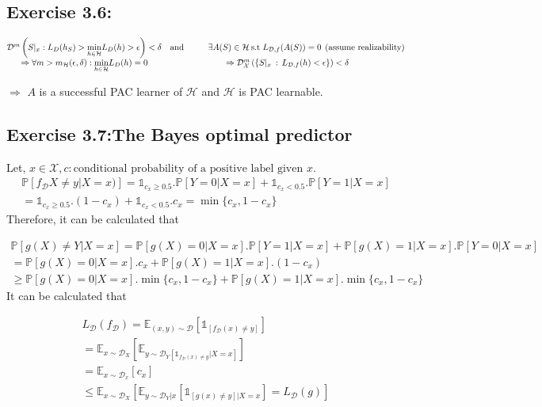\documentclass[]{book}
\begin{document}
\subsection*{Exercise 3.6:}
\begin{equation*}
\begin{matrix}
\mathcal{D}^m\left ( S|_x:L_{D}(h_S)>\underset{h\in \mathcal{H}}{\min}L_{D}(h)>\epsilon \right )<\delta &  \text{and} \hspace{1cm} \exists A(S)\in \mathcal{H} \: \text{s.t} \hspace{0.1cm} L_{\mathcal{D},f}(A(S))=0 \: \: \text{(assume realizability)}    \\ 
\Rightarrow \forall m>m_\mathcal{H}(\epsilon,\delta):\underset{h\in \mathcal{H}}{\min}L_{D}(h)=0 & \Rightarrow  \mathcal{D}^m_\mathcal{X}\left ( \left \{ S|_x \::\,L_{\mathcal{D},f}(h)<\epsilon \right \} \right )<\delta \\
\end{matrix}
\end{equation*}

$\Rightarrow$ $A$ is a successful PAC learner of $\mathcal{H}$ and $\mathcal{H}$ is PAC learnable.

\subsection*{Exercise 3.7:The Bayes optimal predictor}
Let, $x\in \mathcal{X}, c:\text{conditional probability of a positive label
given }x$.
\begin{align*}
    \mathbb{P}\left [ f_\mathcal{D}X\neq y|X=x) \right ]=\mathds{1}_{c_x \geq 0.5}.\mathbb{P}\left [ Y=0|X=x \right ]+\mathds{1}_{c_x < 0.5}.\mathbb{P}\left [ Y=1|X=x \right ] \\
    =\mathds{1}_{c_x \geq 0.5}.(1-c_x)+\mathds{1}_{c_x < 0.5}.c_x=\min\{c_x,1-c_x\}
\end{align*}
Therefore, it can be calculated that 

\begin{align*}
    \mathbb{P}[g(X)\neq Y|X=x]=\mathbb{P}[g(X)=0|X=x].\mathbb{P}[Y=1|X=x]+ \mathbb{P}[g(X)=1|X=x].\mathbb{P}[Y=0|X=x]
\\
=\mathbb{P}[g(X)=0|X=x].c_x+ \mathbb{P}[g(X)=1|X=x].(1-c_x) \\
\geq \mathbb{P}[g(X)=0|X=x].\min\{c_x,1-c_x\}+ \mathbb{P}[g(X)=1|X=x].\min\{c_x,1-c_x\}
\end{align*}
It can be calculated that

\begin{align*}
    L_{\mathcal{D}}(f_\mathcal{D})=\mathbb{E}_{(x,y)\sim \mathcal{D}}[\mathds{1} _{[f_\mathcal{D}(x)\neq y]}] \\
=\mathbb{E}_{x\sim \mathcal{D}_X}\left [ \mathbb{E}_{y\sim \mathcal{D}_Y[\mathds{1} _{f_\mathcal{D}(x)\neq y}|X=x]} \right ]
\\ =\mathbb{E}_{x\sim {\mathcal{D}_x}}[c_x]
\\ \leq\mathbb{E}_{x\sim \mathcal{D}_X}\left [ \mathbb{E}_{y \sim \mathcal{D}_Y|x} [\mathds{1} _{[g(x)\neq y]|X=x}]=L_\mathcal{D} (g) \right ] 
\end{align*}
\end{document}
